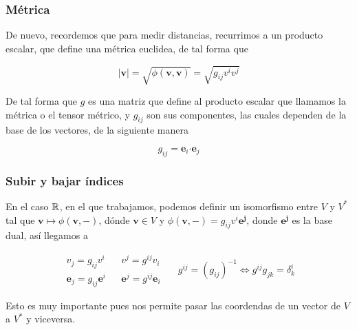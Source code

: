 \subsubsection{Métrica}
De nuevo, recordemos que para medir distancias, recurrimos a un producto escalar, que define una métrica euclidea, de tal forma que
\begin{Large}\begin{equation}
|\bm{v}|=\sqrt{\phi(\bm{v},\bm{v})}=\sqrt{g_{ij} v^i v^j}
\end{equation}\end{Large}
De tal forma que $g$ es una matriz que define al producto escalar que llamamos la métrica o el tensor métrico, y $g_{ij}$ son sus componentes, las cuales dependen de la base de los vectores, de la siguiente manera
\begin{Large}\begin{equation}
g_{ij} = \bm{e}_i \bm{\cdot} \bm{e}_j
\end{equation}\end{Large}
\vspace{-35pt}
\subsubsection{Subir y bajar índices}
En el caso $\mathbb{R}$, en el que trabajamos, podemos definir un isomorfismo entre $V$ y $V^*$ tal que $\bm{v}\mapsto \phi(\bm{v},-)$, dónde $\bm{v} \in V$ y $\phi(\bm{v},-)=g_{ij} v^i \bm{e^j}$, donde $\bm{e^j}$ es la base dual, así llegamos a
\begin{large}\begin{equation}
\begin{matrix}
v_j = g_{ij} v^i && v^j = g^{ij} v_i \\
\bm{e}_j = g_{ij} \bm{e}^i && \bm{e}^j = g^{ij} \bm{e}_i
\end{matrix} \;\;\;\;\; g^{ij} = \left(g_{ij}\right)^{-1} \iff g^{ij} g_{jk} = \delta^i_k
\end{equation}\end{large}
Esto es muy importante pues nos permite pasar las coordendas de un vector de $V$ a $V^*$ y viceversa.